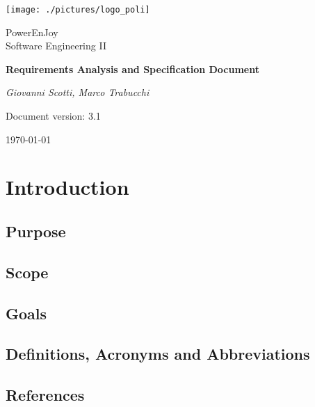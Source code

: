 \documentclass[a4paper,12pt]{report}
\begin{document}
\begin{titlepage}
\centering
\texttt{[image: ./pictures/logo\_poli]}\par
	\vspace{1.5cm}
	{\Large {PowerEnJoy \\ 
		Software Engineering II} \par}
	\vspace{1.5cm}
	{\LARGE \textbf{Requirements Analysis and Specification Document} \par}
	\vspace{1.5cm}
	{\Large\itshape Giovanni Scotti, Marco Trabucchi\par}
	\vspace{2cm}
	\vfill
	{\large Document version: 3.1\par}
	{\large \today \par}
\end{titlepage}

\tableofcontents

\chapter{Introduction}
\label{ch:Introduction}

\section{Purpose}


\section{Scope}


\section{Goals}


\section{Definitions, Acronyms and Abbreviations}


\section{References}

\end{document}
